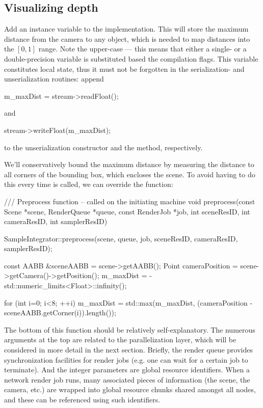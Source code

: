 \subsection{Visualizing depth}
Add an instance variable  to the implementation. This
will store the maximum distance from the camera to any object, which is needed
to map distances into the $[0,1]$ range. Note the upper-case  --- 
this means that either a single- or a double-precision variable is 
substituted based the compilation flags. This variable constitutes local
state, thus it must not be forgotten in the serialization- and unserialization routines:
append
\begin{cpp}
	m_maxDist = stream->readFloat();
\end{cpp}
and
\begin{cpp}
	stream->writeFloat(m_maxDist);
\end{cpp}
to the unserialization constructor and the  method, respectively.

We'll conservatively bound the maximum distance by measuring the
distance to all corners of the bounding box, which encloses the scene.
To avoid having to do this every time  is called,
we can override the  function:
\begin{cpp}
	/// Preprocess function -- called on the initiating machine
	void preprocess(const Scene *scene, RenderQueue *queue, 
			const RenderJob *job, int sceneResID, int cameraResID, 
			int samplerResID) {
		SampleIntegrator::preprocess(scene, queue, job, sceneResID, 
			cameraResID, samplerResID);

		const AABB &sceneAABB = scene->getAABB();
		Point cameraPosition = scene->getCamera()->getPosition();
		m_maxDist = - std::numeric_limits<Float>::infinity();

		for (int i=0; i<8; ++i)
			m_maxDist = std::max(m_maxDist, 
				(cameraPosition - sceneAABB.getCorner(i)).length());
	}
\end{cpp}
The bottom of this function should be relatively self-explanatory. The
numerous arguments at the top are related to the parallelization layer, which will be
considered in more detail in the next section. Briefly, the render queue
provides synchronization facilities for render jobs (e.g. one can wait
for a certain job to terminate). And the integer parameters are
global resource identifiers. When a network render job runs, many associated
pieces of information (the scene, the camera, etc.) are wrapped into global resource chunks
shared amongst all nodes, and these can be referenced using such identifiers.

